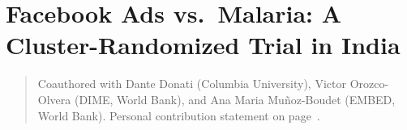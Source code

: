\chapter[Facebook Ads vs.\ Malaria]{Facebook Ads vs.\ Malaria: A Cluster-Randomized Trial in India}
\label{ch:malaria}

\begin{quotation}
  \noindent\small Coauthored with Dante Donati (Columbia University),
  Victor Orozco-Olvera (DIME, World Bank), and Ana Maria Mu\~noz-Boudet
  (EMBED, World Bank). Personal contribution statement on
  page~\pageref{coauthor-statements}.
\end{quotation}



\printbibliography[heading=subbibliography, title={References for Chapter \thechapter}]
